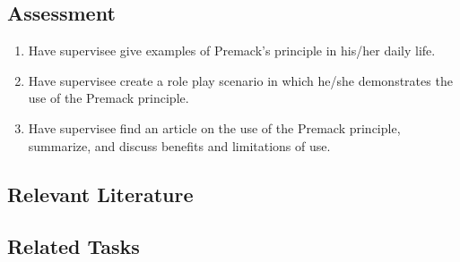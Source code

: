 \subsection{Assessment}
\begin{enumerate}
\item Have supervisee give examples of Premack's principle in his/her daily life.
\item Have supervisee create a role play scenario in which he/she demonstrates the use of the Premack principle.
\item Have supervisee find an article on the use of the Premack principle, summarize, and discuss benefits and limitations of use.
\end{enumerate}
%
\subsection{Relevant Literature}
\begin{refsection}
\nocite{azrin2007physical,
        volkmar2013encyclopedia,
        cooper2007applied,
        mazur1975matching,
        sigafoos2005premack,
        welsh1993application}
\printbibliography[heading=none]
\end{refsection}
%
\subsection{Related Tasks}
\fourdOne{}\\
\fourdTwo{}\\
\fouriSeven{}\\
